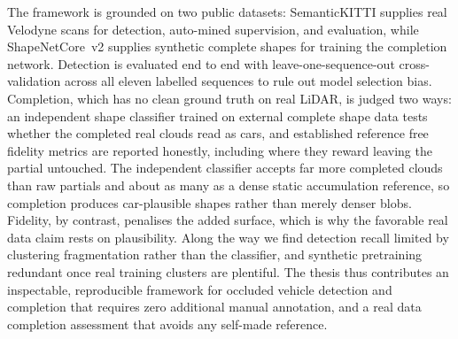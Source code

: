 The framework is grounded on two public datasets: SemanticKITTI supplies real Velodyne
scans for detection, auto-mined supervision, and evaluation, while ShapeNetCore~v2
supplies synthetic complete shapes for training the completion network. Detection is evaluated end to end with leave-one-sequence-out
cross-validation across all eleven labelled sequences to rule out model selection bias.
Completion, which has no clean ground truth on real LiDAR, is judged two ways: an
independent shape classifier trained on external complete shape data tests
whether the completed real clouds read as cars, and established reference free fidelity
metrics are reported honestly, including where they reward leaving the partial untouched.
The independent classifier accepts far more completed clouds than raw partials and about
as many as a dense static accumulation reference, so completion produces car-plausible
shapes rather than merely denser blobs. Fidelity, by contrast, penalises the added
surface, which is why the favorable real data claim rests on plausibility. Along the way
we find detection recall limited by clustering fragmentation rather than the classifier,
and synthetic pretraining redundant once real training clusters are plentiful. The
thesis thus contributes an inspectable, reproducible framework for occluded vehicle
detection and completion that requires zero additional manual annotation, and a
real data completion assessment that avoids any self-made reference.
